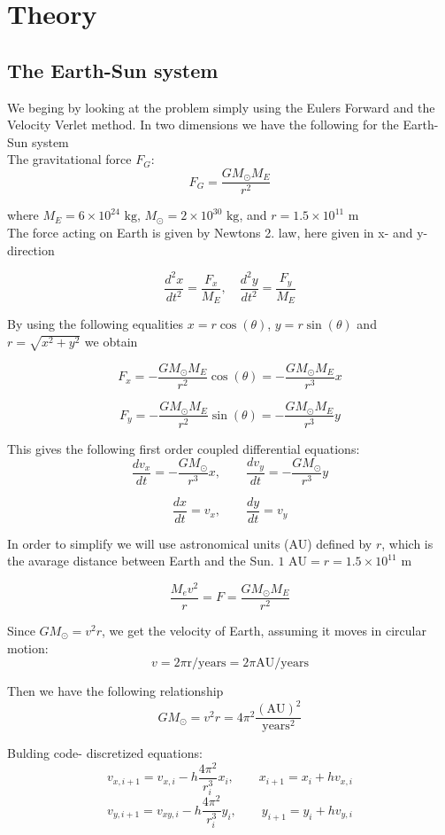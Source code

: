 \documentclass[../main.tex]{subfiles}
\begin{document}
\section{Theory}\label{theory}
\subsection{The Earth-Sun system}
We beging by looking at the problem simply using the Eulers Forward and the Velocity Verlet method.
In two dimensions we have the following for the Earth-Sun system \\

The gravitational force $F_G$:
$$F_G= \frac{GM_{\odot}M_E}{r^2}$$

where $M_E = 6\times 10^{24}\text{ kg}$,  $ M_{\odot} = 2\times 10^{30}\text{ kg}$, and  $r = 1.5\times 10^{11}\text{ m}$\\
The force acting on Earth is given by Newtons 2. law, here given in x- and y- direction

$$ \frac{d^2x}{dt^2} = \frac{F_x}{M_E}, \quad \frac{d^2y}{dt^2} = \frac{F_y}{M_E}$$

By using the following equalities $x = r \cos(\theta)$,  $y = r\sin(\theta)$ and $r = \sqrt{x^2 +y^2}$ we obtain

$$F_x = - \frac{GM_{\odot}M_E}{r^2} \cos(\theta) =- \frac{GM_{\odot}M_E}{r^3}x$$

$$F_y = - \frac{GM_{\odot}M_E}{r^2}\sin(\theta) =- \frac{GM_{\odot}M_E}{r^3}y$$


This gives the following first order  coupled differential equations:
$$ \frac{dv_x}{dt} = - \frac{GM_{\odot}}{r^3}x,\qquad \frac{dv_y}{dt} = - \frac{GM_{\odot}}{r^3}y$$

  $$\frac{dx}{dt} = v_x,\qquad \frac{dy}{dt} = v_y$$

In order to simplify we will use astronomical units (AU) defined by $r$, which is the avarage distance between Earth and the Sun. $1\text{ AU}= r = 1.5 \times 10^{11}\text{ m}$


$$ \frac{M_ev^2}{r} = F = \frac{GM_{\odot}M_E}{r^2}$$


Since $GM_{\odot} = v^2r$, we get the velocity of Earth, assuming it moves in circular motion: $$v = 2\pi \text{r/years}= 2\pi \text{AU/years}$$

Then we have the following relationship
$$GM_{\odot} = v^2r = 4\pi^2 \frac{(\text{AU})^2}{\text{years}^2}$$

Bulding code- discretized equations:
$$v_{x,i+1} = v_{x,i} - h \frac{4\pi^2}{r_i^3}x_i,\qquad x_{i+1} = x_{i} + hv_{x,i}$$
$$v_{y,i+1} = v_{xy,i} - h \frac{4\pi^2}{r_i^3}y_i,\qquad y_{i+1} = y_{i} + hv_{y,i}$$
\end{document}

